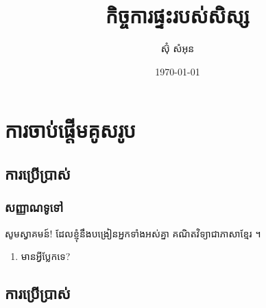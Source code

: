 \documentclass[12pt, a4paper]{book}
\author{ស៊ុំ សំអុន}
\title{កិច្ចការផ្ទះរបស់សិស្ស}
\date{\today}
\begin{document}
	\maketitle
	\frontmatter
	\tableofcontents
	\mainmatter
	\part{ការចាប់ផ្តើមគូសរូប}
	\chapter{ការប្រើប្រាស់ }
	\section{សញ្ញាណទូទៅ}
	
	 {\sffamily សូមស្វាគមន៍!}  ដែលខ្ញុំនឹងបង្រៀនអ្នកទាំងអស់គ្នា  {\ttfamily គណិតវិទ្យាជាភាសាខ្មែរ}  \texten{\LaTeX}។ 
	\begin{enumerate}[k]
		\item មានអ្វីប្លែកទេ?
	\end{enumerate}
	\appendix
	\chapter{ការប្រើប្រាស់ }
	\backmatter
\end{document}
